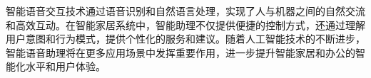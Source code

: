 智能语音交互技术通过语音识别和自然语言处理，实现了人与机器之间的自然交流和高效互动。在智能家居系统中，智能助理不仅提供便捷的控制方式，还通过理解用户意图和行为模式，提供个性化的服务和建议。随着人工智能技术的不断进步，智能语音助理将在更多应用场景中发挥重要作用，进一步提升智能家居和办公的智能化水平和用户体验。








